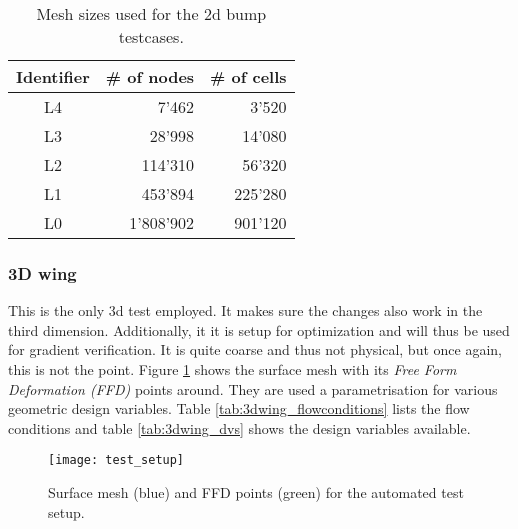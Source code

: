 \begin{table}[H]
    \centering
    \begin{tabular}{c r r}
        Identifier      & \# of nodes   & \# of cells \\
        \toprule
        L4              & 7'462         & 3'520 \\
        L3              & 28'998        & 14'080 \\
        L2              & 114'310       & 56'320\\
        L1              & 453'894       & 225'280 \\
        L0              & 1'808'902       & 901'120 \\

    \end{tabular}
    \caption{Mesh sizes used for the 2d bump testcases.}
    \label{tab:2dbump_mesh_sizes}
\end{table}


\subsubsection{3D wing}
This is the only 3d test employed. It makes sure the changes also work in the
third dimension. Additionally, it it is setup for optimization and will thus be
used for gradient verification. It is quite coarse and thus not physical, but
once again, this is not the point. Figure \ref{fig:3dwing_setup} shows the
surface mesh with its \textit{Free Form Deformation (FFD)} points around. They
are used a parametrisation for various geometric design variables. Table
\ref{tab:3dwing_flowconditions} lists the flow conditions and table
\ref{tab:3dwing_dvs} shows the design variables available.

\begin{figure}[H] \centering
    \texttt{[image: test\_setup]}
    \caption{Surface mesh (blue) and FFD points (green) for the automated test
    setup. \cite{vt1}}
    \label{fig:3dwing_setup}
\end{figure}

